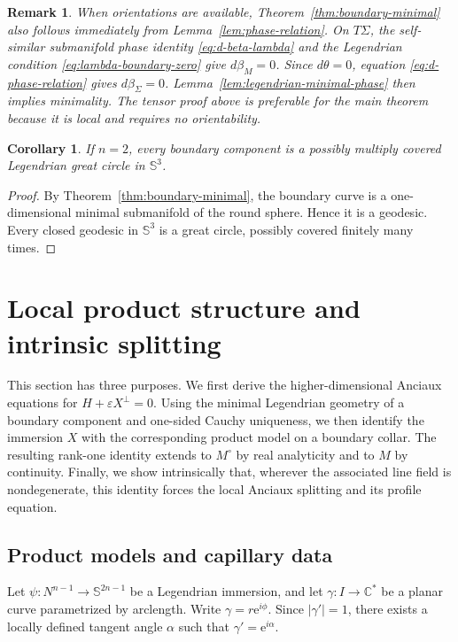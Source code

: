 \documentclass[11pt,a4paper]{article}
\numberwithin{equation}{section}
\newtheorem{corollary}[theorem]{Corollary}
\newtheorem{remark}[theorem]{Remark}
\newcommand{\C}{\mathbb C}
\newcommand{\Sph}{\mathbb S}
\newcommand{\ee}{\mathrm e}
\begin{document}
\begin{remark}
When orientations are available, Theorem~\ref{thm:boundary-minimal} also follows immediately from Lemma~\ref{lem:phase-relation}.  On $T\Sigma$, the self-similar submanifold phase identity \eqref{eq:d-beta-lambda} and the Legendrian condition \eqref{eq:lambda-boundary-zero} give $d\beta_M=0$.  Since $d\theta=0$, equation \eqref{eq:d-phase-relation} gives $d\beta_\Sigma=0$.  Lemma~\ref{lem:legendrian-minimal-phase} then implies minimality.  The tensor proof above is preferable for the main theorem because it is local and requires no orientability.
\end{remark}

\begin{corollary}
If $n=2$, every boundary component is a possibly multiply covered Legendrian great circle in $\Sph^3$.
\end{corollary}

\begin{proof}
By Theorem~\ref{thm:boundary-minimal}, the boundary curve is a one-dimensional minimal submanifold of the round sphere.  Hence it is a geodesic.  Every closed geodesic in $\Sph^3$ is a great circle, possibly covered finitely many times.
\end{proof}

\section{Local product structure and intrinsic splitting}\label{sec:rank-one}

This section has three purposes. We first derive the higher-dimensional Anciaux equations for $H+\varepsilon X^\perp=0$. Using the minimal Legendrian geometry of a boundary component  and one-sided Cauchy uniqueness, we then identify the immersion \(X\) with the corresponding product model on a boundary collar. The resulting rank-one identity extends to \(M^\circ\) by real analyticity  and to $M$ by continuity.  Finally, we show intrinsically that, wherever the associated line field is nondegenerate, this identity forces the local Anciaux splitting and its profile equation.

\subsection{Product models and capillary data}
\label{subsec:product-models}

Let \(\psi:N^{n-1}\longrightarrow\Sph^{2n-1}\) be a Legendrian immersion, and let
\(\gamma:I\longrightarrow\C^*\) be a planar curve parametrized by arclength. Write
\(\gamma=r\ee^{i\phi}\). Since \(|\gamma'|=1\), there exists a locally defined
tangent angle \(\alpha\) such that \(\gamma'=\ee^{i\alpha}\).
\end{document}
